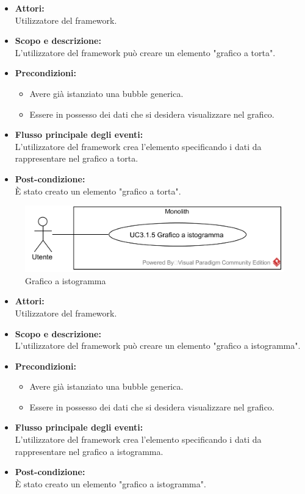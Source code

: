 \begin{itemize}
	\item \textbf{Attori:}
	\\Utilizzatore del framework.
	\item \textbf{Scopo e descrizione:} 
	\\L'utilizzatore del framework può creare un elemento "grafico a torta".
	\item \textbf{Precondizioni:}
	\begin{itemize}
		\item Avere già istanziato una bubble generica.
		\item Essere in possesso dei dati che si desidera visualizzare nel grafico.
	\end{itemize}
	\item \textbf{Flusso principale degli eventi:}
	\\L'utilizzatore del framework crea l'elemento specificando i dati da rappresentare nel grafico a torta.
	\item \textbf{Post-condizione:}
	\\È stato creato un elemento "grafico a torta".
\end{itemize}

\begin{samepage}
\nopagebreak
\begin{figure}[H]
	\centering
	\includegraphics[width=15cm]{../../documenti/AnalisiDeiRequisiti/Diagrammi_img/usecase/uc1_29.png}
	\caption{\UCFFCaption{} Grafico a istogramma}
\end{figure}
\end{samepage}

\begin{itemize}
	\item \textbf{Attori:}
	\\Utilizzatore del framework.
	\item \textbf{Scopo e descrizione:} 
	\\L'utilizzatore del framework può creare un elemento "grafico a istogramma".
	\item \textbf{Precondizioni:}
	\begin{itemize}
		\item Avere già istanziato una bubble generica.
		\item Essere in possesso dei dati che si desidera visualizzare nel grafico.
	\end{itemize}
	\item \textbf{Flusso principale degli eventi:}
	\\L'utilizzatore del framework crea l'elemento specificando i dati da rappresentare nel grafico a istogramma.
	\item \textbf{Post-condizione:}
	\\È stato creato un elemento "grafico a istogramma".
\end{itemize}

